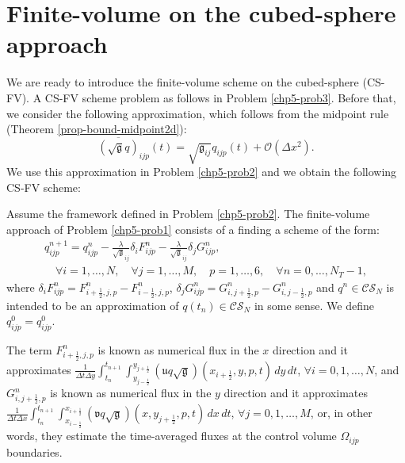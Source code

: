 \section{Finite-volume on the cubed-sphere approach}
\label{chp-cs-fvcs}
We are ready to introduce the finite-volume scheme on the cubed-sphere (CS-FV).
A CS-FV scheme problem as follows in Problem \ref{chp5-prob3}.
Before that, we consider the following approximation, which follows from the midpoint rule (Theorem \ref{prop-bound-midpoint2d}):
\begin{equation}
	\label{midpoint-approx}
	\overline{(\sqrt{\mathfrak{g}}q)}_{ijp}(t)  = \sqrt{\mathfrak{g}_{ij}} {q}_{ijp}(t) +\mathcal{O}(\Delta x^2).
\end{equation}
We use this approximation in Problem \ref{chp5-prob2} and we obtain the following CS-FV scheme:
\begin{prob}[CS-FV scheme]
	\label{chp5-prob3}
	Assume the framework defined in Problem \ref{chp5-prob2}.
	The finite-volume approach of Problem \ref{chp5-prob1}
	consists of a finding a scheme of the form:
	\begin{align}
		\label{chp5-csfv}
		{q}_{ijp}^{n+1} =  {q}_{ijp}^{n} - \frac{\lambda}{\sqrt{\mathfrak{g}}_{ij}} \delta_i {F}_{ijp}^{n}
		-  \frac{\lambda}{\sqrt{\mathfrak{g}}_{ij}}  \delta_j {G}_{ijp}^{n},
		\\ \nonumber \quad \forall i = 1, \ldots, N, \quad \forall j = 1, \ldots, M, \quad p =1, \ldots, 6,
		\quad \forall n = 0, \ldots, N_T-1,
	\end{align}
	where $ \delta_i F_{ijp}^n =
	{F}_{i+\frac{1}{2},j,p}^{n} 
	- {F}_{i-\frac{1}{2},j,p}^{n}$,
	$ \delta_j G_{ijp}^n =
	{G}_{i,j+\frac{1}{2},p}^{n} 
	- {G}_{i,j-\frac{1}{2},p}^{n}$ 
	and ${q}^{n}\in \mathcal{CS}_N$ is intended to be an approximation
	of ${q}(t_{n})\in \mathcal{CS}_N$ in some sense. We define
	${q}_{ijp}^{0} = {q}^0_{ijp}$.
	
	The term ${F}_{i+\frac{1}{2}, j, p}^{n}$ is known as numerical flux in the 
	$x$ direction and it approximates
	$\frac{1}{\Delta t \Delta y }\int_{t_n}^{t_{n+1}} 
	\int_{y_{j-\frac{1}{2}}}^{y_{j+\frac{1}{2}}} 
	(\mathfrak{u}q\sqrt{\mathfrak{g}})(x_{i+\frac{1}{2}}, y, p, t) \,dy \,dt $,
	$\forall i = 0, 1, \ldots, N$, and 
	${G}_{i, j+\frac{1}{2}, p}^{n}$ is known as numerical flux in the 
	$y$ direction and it approximates
	$\frac{1}{\Delta t\Delta x}\int_{t_n}^{t_{n+1}}  
	\int_{x_{i-\frac{1}{2}}}^{x_{i+\frac{1}{2}}}
	(\mathfrak{v}q\sqrt{\mathfrak{g}})(x, y_{j+\frac{1}{2}}, p, t) \,dx \,dt $,
	$\forall j = 0, 1, \ldots, M$,
	or, in other words, they estimate the time-averaged
	fluxes at the control volume $\Omega_{ijp}$ boundaries.
\end{prob}
